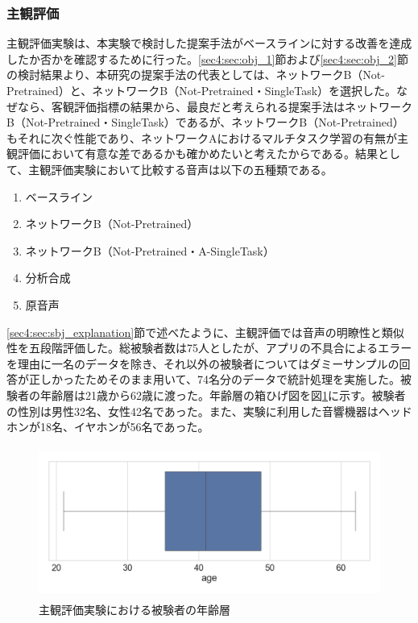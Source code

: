 \documentclass[12pt]{jarticle}
\numberwithin{equation}{section}    %
\numberwithin{figure}{section}      %
\numberwithin{table}{section}      %
\begin{document}
\subsubsection{主観評価}
主観評価実験は、本実験で検討した提案手法がベースラインに対する改善を達成したか否かを確認するために行った。\ref{sec4:sec:obj_1}節および\ref{sec4:sec:obj_2}節の検討結果より、本研究の提案手法の代表としては、ネットワークB（Not-Pretrained）と、ネットワークB（Not-Pretrained・SingleTask）を選択した。なぜなら、客観評価指標の結果から、最良だと考えられる提案手法はネットワークB（Not-Pretrained・SingleTask）であるが、ネットワークB（Not-Pretrained）もそれに次ぐ性能であり、ネットワークAにおけるマルチタスク学習の有無が主観評価において有意な差であるかも確かめたいと考えたからである。結果として、主観評価実験において比較する音声は以下の五種類である。
\begin{enumerate}
    \item ベースライン
    \item ネットワークB（Not-Pretrained）
    \item ネットワークB（Not-Pretrained・A-SingleTask）
    \item 分析合成
    \item 原音声
\end{enumerate}
\ref{sec4:sec:sbj_explanation}節で述べたように、主観評価では音声の明瞭性と類似性を五段階評価した。総被験者数は75人としたが、アプリの不具合によるエラーを理由に一名のデータを除き、それ以外の被験者についてはダミーサンプルの回答が正しかったためそのまま用いて、74名分のデータで統計処理を実施した。被験者の年齢層は21歳から62歳に渡った。年齢層の箱ひげ図を図\ref{sec4:fig:age}に示す。被験者の性別は男性32名、女性42名であった。また、実験に利用した音響機器はヘッドホンが18名、イヤホンが56名であった。
\begin{figure}[bt]
    \centering
    \includegraphics[height=50mm]{./figure/sec4/sbj/age.png}
    \caption{主観評価実験における被験者の年齢層}
    \label{sec4:fig:age}
\end{figure}
\end{document}
